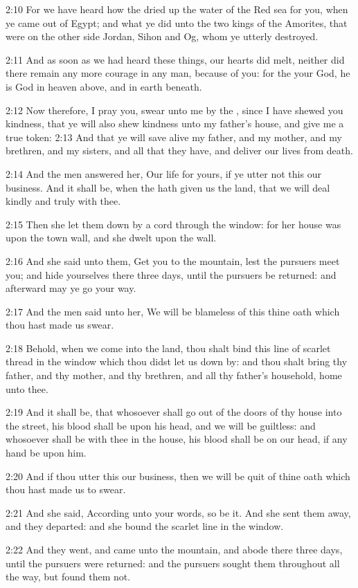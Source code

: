 2:10 For we have heard how the \LORD dried up the water of the Red sea
for you, when ye came out of Egypt; and what ye did unto the two kings
of the Amorites, that were on the other side Jordan, Sihon and Og,
whom ye utterly destroyed.

2:11 And as soon as we had heard these things, our hearts did melt,
neither did there remain any more courage in any man, because of you:
for the \LORD your God, he is God in heaven above, and in earth
beneath.

2:12 Now therefore, I pray you, swear unto me by the \LORD, since I
have shewed you kindness, that ye will also shew kindness unto my
father's house, and give me a true token: 2:13 And that ye will save
alive my father, and my mother, and my brethren, and my sisters, and
all that they have, and deliver our lives from death.

2:14 And the men answered her, Our life for yours, if ye utter not
this our business. And it shall be, when the \LORD hath given us the
land, that we will deal kindly and truly with thee.

2:15 Then she let them down by a cord through the window: for her
house was upon the town wall, and she dwelt upon the wall.

2:16 And she said unto them, Get you to the mountain, lest the
pursuers meet you; and hide yourselves there three days, until the
pursuers be returned: and afterward may ye go your way.

2:17 And the men said unto her, We will be blameless of this thine
oath which thou hast made us swear.

2:18 Behold, when we come into the land, thou shalt bind this line of
scarlet thread in the window which thou didst let us down by: and thou
shalt bring thy father, and thy mother, and thy brethren, and all thy
father's household, home unto thee.

2:19 And it shall be, that whosoever shall go out of the doors of thy
house into the street, his blood shall be upon his head, and we will
be guiltless: and whosoever shall be with thee in the house, his blood
shall be on our head, if any hand be upon him.

2:20 And if thou utter this our business, then we will be quit of
thine oath which thou hast made us to swear.

2:21 And she said, According unto your words, so be it. And she sent
them away, and they departed: and she bound the scarlet line in the
window.

2:22 And they went, and came unto the mountain, and abode there three
days, until the pursuers were returned: and the pursuers sought them
throughout all the way, but found them not.

